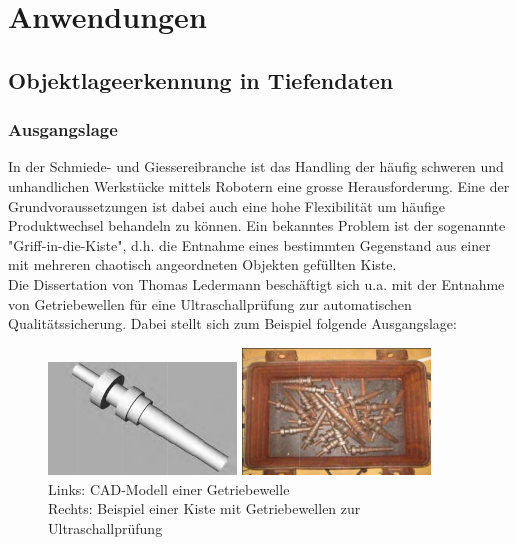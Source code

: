 \section{Anwendungen}

\subsection{Objektlageerkennung in Tiefendaten} 

\subsubsection{Ausgangslage}
In der Schmiede- und Giessereibranche ist das Handling der häufig schweren und unhandlichen Werkstücke mittels Robotern eine grosse Herausforderung. Eine der Grundvoraussetzungen ist dabei auch eine hohe Flexibilität um häufige Produktwechsel behandeln zu können. Ein bekanntes Problem ist der sogenannte "Griff-in-die-Kiste", d.h. die Entnahme eines bestimmten Gegenstand aus einer mit mehreren chaotisch angeordneten Objekten gefüllten Kiste. \\

Die Dissertation \cite{Diss-Ledermann} von Thomas Ledermann beschäftigt sich u.a. mit der Entnahme von Getriebewellen für eine Ultraschallprüfung zur automatischen Qualitätssicherung. Dabei stellt sich zum Beispiel folgende Ausgangslage: \\

\begin{figure}[htbp]
	\centering
	\begin{minipage}{6cm}
		\includegraphics[width=5cm]{images/welle-cad}
	\end{minipage}
	\begin{minipage}{6cm}
		\includegraphics[width=5cm]{images/welle-kiste}
	\end{minipage}
	\caption{	Links: CAD-Modell einer Getriebewelle \\
				Rechts: Beispiel einer Kiste mit Getriebewellen zur Ultraschallprüfung}
	\label{Fig-Getriebewelle}
\end{figure}

